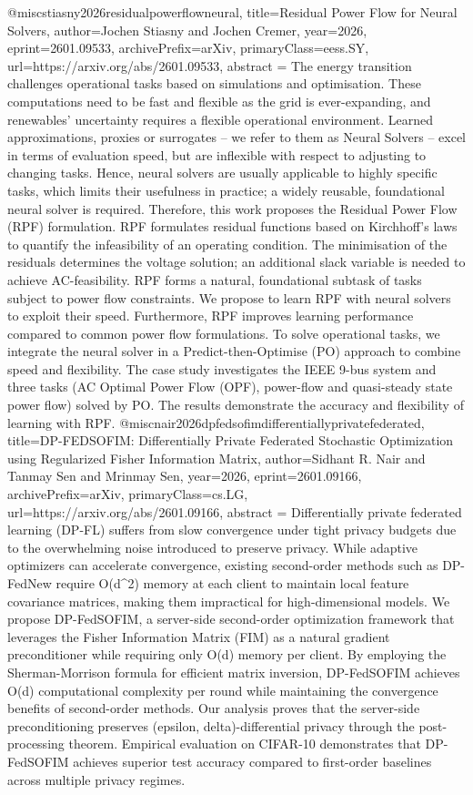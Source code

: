 {}@misc{stiasny2026residualpowerflowneural,
      title={Residual Power Flow for Neural Solvers}, 
      author={Jochen Stiasny and Jochen Cremer},
      year={2026},
      eprint={2601.09533},
      archivePrefix={arXiv},
      primaryClass={eess.SY},
      url={https://arxiv.org/abs/2601.09533},
      abstract = {The energy transition challenges operational tasks based on simulations and optimisation. These computations need to be fast and flexible as the grid is ever-expanding, and renewables' uncertainty requires a flexible operational environment. Learned approximations, proxies or surrogates -- we refer to them as Neural Solvers -- excel in terms of evaluation speed, but are inflexible with respect to adjusting to changing tasks. Hence, neural solvers are usually applicable to highly specific tasks, which limits their usefulness in practice; a widely reusable, foundational neural solver is required. Therefore, this work proposes the Residual Power Flow (RPF) formulation. RPF formulates residual functions based on Kirchhoff's laws to quantify the infeasibility of an operating condition. The minimisation of the residuals determines the voltage solution; an additional slack variable is needed to achieve AC-feasibility. RPF forms a natural, foundational subtask of tasks subject to power flow constraints. We propose to learn RPF with neural solvers to exploit their speed. Furthermore, RPF improves learning performance compared to common power flow formulations. To solve operational tasks, we integrate the neural solver in a Predict-then-Optimise (PO) approach to combine speed and flexibility. The case study investigates the IEEE 9-bus system and three tasks (AC Optimal Power Flow (OPF), power-flow and quasi-steady state power flow) solved by PO. The results demonstrate the accuracy and flexibility of learning with RPF.}
}@misc{nair2026dpfedsofimdifferentiallyprivatefederated,
      title={DP-FEDSOFIM: Differentially Private Federated Stochastic Optimization using Regularized Fisher Information Matrix}, 
      author={Sidhant R. Nair and Tanmay Sen and Mrinmay Sen},
      year={2026},
      eprint={2601.09166},
      archivePrefix={arXiv},
      primaryClass={cs.LG},
      url={https://arxiv.org/abs/2601.09166},
      abstract = {Differentially private federated learning (DP-FL) suffers from slow convergence under tight privacy budgets due to the overwhelming noise introduced to preserve privacy. While adaptive optimizers can accelerate convergence, existing second-order methods such as DP-FedNew require O(d^2) memory at each client to maintain local feature covariance matrices, making them impractical for high-dimensional models. We propose DP-FedSOFIM, a server-side second-order optimization framework that leverages the Fisher Information Matrix (FIM) as a natural gradient preconditioner while requiring only O(d) memory per client. By employing the Sherman-Morrison formula for efficient matrix inversion, DP-FedSOFIM achieves O(d) computational complexity per round while maintaining the convergence benefits of second-order methods. Our analysis proves that the server-side preconditioning preserves (epsilon, delta)-differential privacy through the post-processing theorem. Empirical evaluation on CIFAR-10 demonstrates that DP-FedSOFIM achieves superior test accuracy compared to first-order baselines across multiple privacy regimes.}
}
